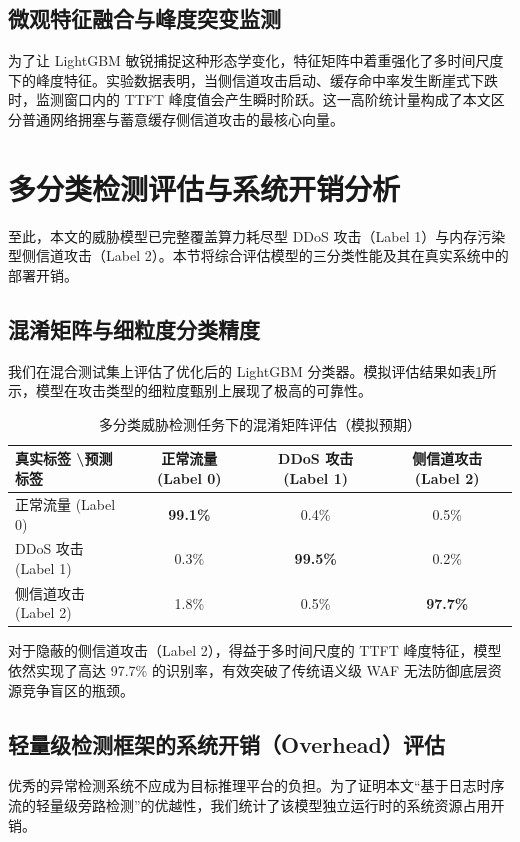 \documentclass[master, vlined]{DissertUESTC}
\begin{document}
	\subsection{微观特征融合与峰度突变监测}
	为了让 LightGBM 敏锐捕捉这种形态学变化，特征矩阵中着重强化了多时间尺度下的峰度特征。实验数据表明，当侧信道攻击启动、缓存命中率发生断崖式下跌时，监测窗口内的 TTFT 峰度值会产生瞬时阶跃。这一高阶统计量构成了本文区分普通网络拥塞与蓄意缓存侧信道攻击的最核心向量。

	\section{多分类检测评估与系统开销分析}

	至此，本文的威胁模型已完整覆盖算力耗尽型 DDoS 攻击（Label 1）与内存污染型侧信道攻击（Label 2）。本节将综合评估模型的三分类性能及其在真实系统中的部署开销。

	\subsection{混淆矩阵与细粒度分类精度}
	我们在混合测试集上评估了优化后的 LightGBM 分类器。模拟评估结果如表\ref{tab: 三分类混淆矩阵}所示，模型在攻击类型的细粒度甄别上展现了极高的可靠性。

	\begin{table}[!ht]
		\caption{多分类威胁检测任务下的混淆矩阵评估（模拟预期）} \label{tab: 三分类混淆矩阵}
		\begin{tabular}{l c c c}
			\toprule
			\textbf{真实标签 \textbackslash 预测标签} & \textbf{正常流量 (Label 0)} & \textbf{DDoS 攻击 (Label 1)} & \textbf{侧信道攻击 (Label 2)} \\
			\midrule
			正常流量 (Label 0) & \textbf{99.1\%} & 0.4\% & 0.5\% \\
			DDoS 攻击 (Label 1) & 0.3\% & \textbf{99.5\%} & 0.2\% \\
			侧信道攻击 (Label 2) & 1.8\% & 0.5\% & \textbf{97.7\%} \\
			\bottomrule
		\end{tabular}
	\end{table}

	对于隐蔽的侧信道攻击（Label 2），得益于多时间尺度的 TTFT 峰度特征，模型依然实现了高达 97.7\% 的识别率，有效突破了传统语义级 WAF 无法防御底层资源竞争盲区的瓶颈。

	\subsection{轻量级检测框架的系统开销（Overhead）评估}
	优秀的异常检测系统不应成为目标推理平台的负担。为了证明本文“基于日志时序流的轻量级旁路检测”的优越性，我们统计了该模型独立运行时的系统资源占用开销。
\end{document}
